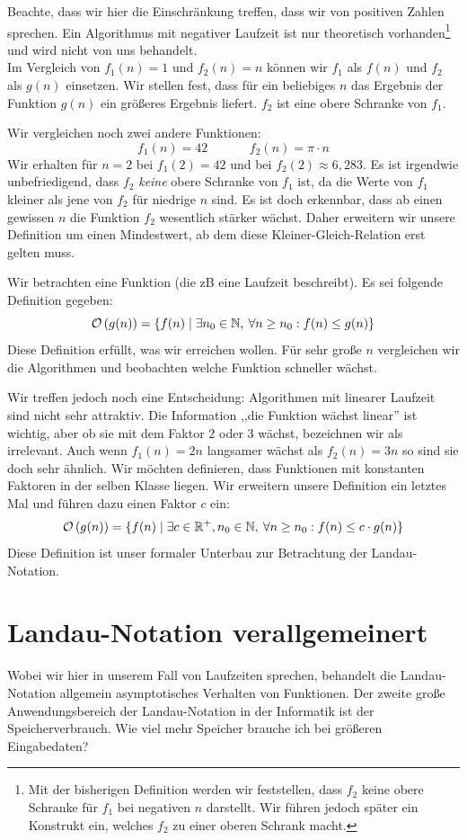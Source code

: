 Beachte, dass wir hier die Einschränkung treffen, dass wir von positiven Zahlen sprechen. Ein Algorithmus mit negativer Laufzeit ist nur theoretisch vorhanden\footnote{Mit der bisherigen Definition werden wir feststellen, dass $f_2$ keine obere Schranke für $f_1$ bei negativen $n$ darstellt. Wir führen jedoch später ein Konstrukt ein, welches $f_2$ zu einer oberen Schrank macht.} und wird nicht von uns behandelt. \\
Im Vergleich von $f_1(n) = 1$ und $f_2(n) = n$ können wir $f_1$ als $f(n)$ und $f_2$ als $g(n)$ einsetzen. Wir stellen fest, dass für ein beliebiges $n$ das Ergebnis der Funktion $g(n)$ ein größeres Ergebnis liefert. $f_2$ ist eine obere Schranke von $f_1$.

Wir vergleichen noch zwei andere Funktionen:
\[
   f_1(n) = 42   \hspace{40pt}  f_2(n) = \pi \cdot n
\]
Wir erhalten für $n = 2$ bei $f_1(2) = 42$ und bei $f_2(2) \approx 6,283$. Es ist irgendwie unbefriedigend, dass $f_2$ \emph{keine} obere Schranke von $f_1$ ist, da die Werte von $f_1$ kleiner als jene von $f_2$ für niedrige $n$ sind. Es ist doch erkennbar, dass ab einen gewissen $n$ die Funktion $f_2$ wesentlich stärker wächst. Daher erweitern wir unsere Definition um einen Mindestwert, ab dem diese Kleiner-Gleich-Relation erst gelten muss.

Wir betrachten eine Funktion (die zB eine Laufzeit beschreibt). Es sei folgende Definition gegeben:
\[
  \mathcal{O}\left(g(n)\right) = \{ f(n) \mid \exists n_0 \in \mathbb{N}, \:\forall n \geq n_0: f(n) \leq g(n) \}
\]
Diese Definition erfüllt, was wir erreichen wollen. Für sehr große $n$ vergleichen wir die Algorithmen und beobachten welche Funktion schneller wächst.

Wir treffen jedoch noch eine Entscheidung: Algorithmen mit linearer Laufzeit sind nicht sehr attraktiv. Die Information ,,die Funktion wächst linear'' ist wichtig, aber ob sie mit dem Faktor $2$ oder $3$ wächst, bezeichnen wir als irrelevant. Auch wenn $f_1(n) = 2n$ langsamer wächst als $f_2(n) = 3n$ so sind sie doch sehr ähnlich. Wir möchten definieren, dass Funktionen mit konstanten Faktoren in der selben Klasse liegen. Wir erweitern unsere Definition ein letztes Mal und führen dazu einen Faktor $c$ ein:
\[
   \mathcal{O}\left(g(n)\right) = \{ f(n) \mid \exists c \in \mathbb{R}^+, n_0 \in \mathbb{N},
                  \:\forall n \geq n_0: f(n) \leq c \cdot g(n) \}
\]
%
Diese Definition ist unser formaler Unterbau zur Betrachtung der Landau-Notation.

\section{Landau-Notation verallgemeinert}
%
Wobei wir hier in unserem Fall von Laufzeiten sprechen, behandelt die Landau-Notation allgemein asymptotisches Verhalten von Funktionen. Der zweite große Anwendungsbereich der Landau-Notation in der Informatik ist der Speicherverbrauch. Wie viel mehr Speicher brauche ich bei größeren Eingabedaten?

